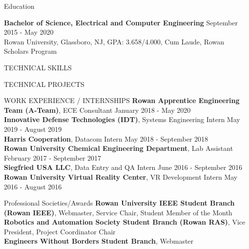 \documentclass{classes/resume} %
\begin{document}
\begin{rSection}{Education}

  {\bf Bachelor of Science, Electrical and Computer Engineering} \hfill
  {September 2015 - May 2020}
  \\
  Rowan University, Glassboro, NJ,  GPA:  3.658/4.000, Cum Laude, Rowan Scholars Program

\end{rSection}


\begin{rSection}{TECHNICAL SKILLS}

  \skills

\end{rSection}


\begin{rSection}{TECHNICAL PROJECTS}
  \projects

\end{rSection}



\begin{rSection}{WORK EXPERIENCE / INTERNSHIPS} \itemsep -3pt
  \textbf{Rowan Apprentice Engineering Team (A-Team)}, ECE Consultant \hfill January 2018 - May 2020\\
  \textbf{Innovative Defense Technologies (IDT)}, Systems Engineering Intern \hfill May 2019 - August 2019\\
  \textbf{Harris Cooperation}, Datacom Intern \hfill May 2018 - September 2018\\
  \textbf{Rowan University Chemical Engineering Department}, Lab Assistant \hfill February 2017 - September 2017\\
  \textbf{Siegfried USA LLC}, Data Entry and QA Intern \hfill June 2016 - September 2016\\
  \textbf{Rowan University Virtual Reality Center}, VR Development Intern \hfill May 2016 - August 2016
\end{rSection}

\begin{rSection}{Professional Societies/Awards} \itemsep -3pt
  {\textbf{Rowan University IEEE Student Branch (Rowan IEEE)}, Webmaster,
  Service Chair, Student Member of the Month}\\
  {\textbf{Robotics and Automation Society Student Branch (Rowan RAS)}, Vice President, Project Coordinator Chair}\\
  {\textbf{Engineers Without Borders Student Branch}, Webmaster}
\end{rSection}
\end{document}
